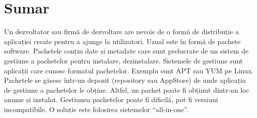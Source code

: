 \section{Sumar}
\label{sec:package:summary}

Un dezvoltator sau firmă de dezvoltare are nevoie de o formă de distribuție a aplicației create pentru a ajunge la utilizatori. Uzual este în formă de pachete software.
Pachetele conțin date și metadate care sunt prelucrate de un sistem de gestiune a pachetelor pentru instalare, dezinstalare.
Sistemele de gestiune sunt aplicații care cunosc formatul pachetelor. Exemplu sunt APT sau YUM pe Linux.
Pachetele se găsesc într-un depozit (repository sau AppStore) de unde aplicația de gestiune a pachetelor le obține. Altfel, un pachet poate fi obținut dintr-un loc anume și instalat.
Gestiunea pachetelor poate fi dificilă, pot fi versiuni incompatibile. O soluție este folosirea sistemelor “all-in-one”.
